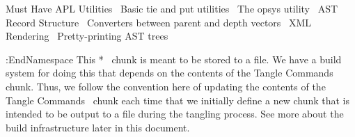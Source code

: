 \documentclass{article}%
\begin{document}
        \LA{}Must Have APL Utilities~{\nwtagstyle{}}\RA{}
        \LA{}Basic \code{}tie\edoc{} and \code{}put\edoc{} utilities~{\nwtagstyle{}}\RA{}
        \LA{}The \code{}opsys\edoc{} utility~{\nwtagstyle{}}\RA{}
        \LA{}AST Record Structure~{\nwtagstyle{}}\RA{}
        \LA{}Converters between parent and depth vectors~{\nwtagstyle{}}\RA{}
        \LA{}XML Rendering~{\nwtagstyle{}}\RA{}
        \LA{}Pretty-printing AST trees~{\nwtagstyle{}}\RA{}

:EndNamespace
\eatline
\nwnotused{*}\nwendcode{}\nwdocspar
This {\Tt{}\LA{}*~{\nwtagstyle{}}\RA{}\nwendquote} chunk is meant to be stored to a file. 
We have a build system for doing this that depends
on the contents of the {\Tt{}\LA{}Tangle Commands~{\nwtagstyle{}}\RA{}\nwendquote} chunk. 
Thus, we follow the convention here of updating the contents of 
the {\Tt{}\LA{}Tangle Commands~{\nwtagstyle{}}\RA{}\nwendquote} chunk each time that we initially define
a new chunk that is intended to be output to a file during the 
tangling process. 
See more about the build infrastructure later in this document.
\end{document}
